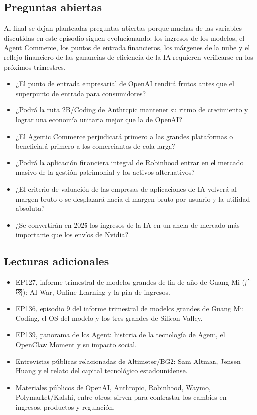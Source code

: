 \documentclass[a4paper]{article}
\begin{document}
\subsection{Preguntas abiertas}

Al final se dejan planteadas preguntas abiertas porque muchas de las variables discutidas en este episodio siguen evolucionando: los ingresos de los modelos, el Agent Commerce, los puntos de entrada financieros, los márgenes de la nube y el reflejo financiero de las ganancias de eficiencia de la IA requieren verificarse en los próximos trimestres.

\begin{itemize}
\item ¿El punto de entrada empresarial de OpenAI rendirá frutos antes que el superpunto de entrada para consumidores?
\item ¿Podrá la ruta 2B/Coding de Anthropic mantener su ritmo de crecimiento y lograr una economía unitaria mejor que la de OpenAI?
\item ¿El Agentic Commerce perjudicará primero a las grandes plataformas o beneficiará primero a los comerciantes de cola larga?
\item ¿Podrá la aplicación financiera integral de Robinhood entrar en el mercado masivo de la gestión patrimonial y los activos alternativos?
\item ¿El criterio de valuación de las empresas de aplicaciones de IA volverá al margen bruto o se desplazará hacia el margen bruto por usuario y la utilidad absoluta?
\item ¿Se convertirán en 2026 los ingresos de la IA en un ancla de mercado más importante que los envíos de Nvidia?
\end{itemize}

\subsection{Lecturas adicionales}

\begin{itemize}
\item EP127, informe trimestral de modelos grandes de fin de año de Guang Mi (广密): AI War, Online Learning y la pila de ingresos.
\item EP136, episodio 9 del informe trimestral de modelos grandes de Guang Mi: Coding, el OS del modelo y los tres grandes de Silicon Valley.
\item EP139, panorama de los Agent: historia de la tecnología de Agent, el OpenClaw Moment y su impacto social.
\item Entrevistas públicas relacionadas de Altimeter/BG2: Sam Altman, Jensen Huang y el relato del capital tecnológico estadounidense.
\item Materiales públicos de OpenAI, Anthropic, Robinhood, Waymo, Polymarket/Kalshi, entre otros: sirven para contrastar los cambios en ingresos, productos y regulación.
\end{itemize}
\end{document}
